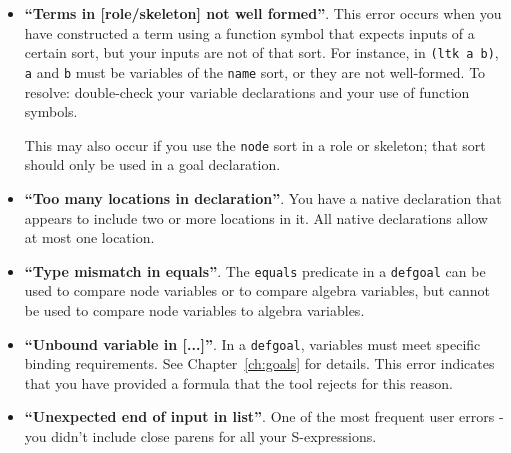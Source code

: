 \begin{itemize}
\item \textbf{``Terms in [role/skeleton] not well formed''}.  This error occurs
  when you have constructed a term using a function symbol that
  expects inputs of a certain sort, but your inputs are not of that
  sort.  For instance, in \texttt{(ltk a b)}, \texttt{a} and
  \texttt{b} must be variables of the \texttt{name} sort, or they are not
  well-formed.  To resolve: double-check your variable declarations and
  your use of function symbols.

  This may also occur if you use the \texttt{node} sort in a role or skeleton; that
  sort should only be used in a goal declaration.

\item \textbf{``Too many locations in declaration''}.  You have a
  native declaration that appears to include two or more
  locations in it.  All native declarations allow at most one
  location.

\item \textbf{``Type mismatch in equals''}.  The \texttt{equals} predicate
  in a \texttt{defgoal} can be used to compare node variables or to compare
  algebra variables, but cannot be used to compare node variables to algebra
  variables.

\item \textbf{``Unbound variable in [...]''}.  In a \texttt{defgoal},
  variables must meet specific binding requirements.  See Chapter~\ref{ch:goals}
  for details.  This error indicates that you have provided a formula that the
  tool rejects for this reason.

\item \textbf{``Unexpected end of input in list''}.  One of the most frequent
  user errors - you didn't include close parens for all your S-expressions.

\end{itemize}

